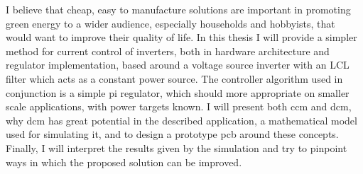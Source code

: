 I believe that cheap, easy to manufacture solutions are important in promoting green energy to a wider audience, especially households and hobbyists, that would want to improve their quality of life.
In this thesis I will provide a simpler method for current control of inverters, both in hardware architecture and regulator implementation, based around a voltage source inverter with an LCL filter which acts as a constant power source.
The controller algorithm used in conjunction is a simple \gls{pi} regulator, which should more appropriate on smaller scale applications, with power targets known.
I will present both \gls{ccm} and \gls{dcm}, why \gls{dcm} has great potential in the described application, a mathematical model used for simulating it, and to design a prototype \gls{pcb} around these concepts.
Finally, I will interpret the results given by the simulation and try to pinpoint ways in which the proposed solution can be improved.